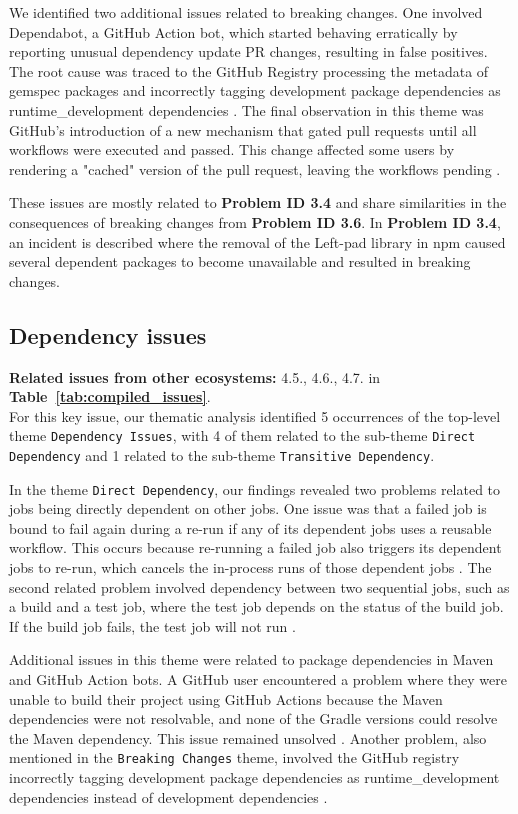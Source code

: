 \documentclass[conference]{IEEEtran}
\begin{document}
	We identified two additional issues related to breaking changes. One involved Dependabot, a GitHub Action bot, which started behaving erratically by reporting unusual dependency update PR changes, resulting in false positives. The root cause was traced to the GitHub Registry processing the metadata of gemspec packages and incorrectly tagging development package dependencies as runtime\_development dependencies \cite{nbibler2024}. The final observation in this theme was GitHub's introduction of a new mechanism that gated pull requests until all workflows were executed and passed. This change affected some users by rendering a "cached" version of the pull request, leaving the workflows pending \cite{tuves2024}.

	These issues are mostly related to \textbf{Problem ID 3.4} and share similarities in the consequences of breaking changes from \textbf{Problem ID 3.6}. In \textbf{Problem ID 3.4}, an incident is described where the removal of the Left-pad library in npm caused several dependent packages to become unavailable and resulted in breaking changes.
\subsection*{\textbf{Dependency issues}}
\textbf{Related issues from other ecosystems:} 4.5., 4.6., 4.7. in \textbf{Table~\ref{tab:compiled_issues}}.\\

	For this key issue, our thematic analysis identified 5 occurrences of the top-level theme \texttt{Dependency Issues}, with 4 of them related to the sub-theme \texttt{Direct Dependency} and 1 related to the sub-theme \texttt{Transitive Dependency}.

	In the theme \texttt{Direct Dependency}, our findings revealed two problems related to jobs being directly dependent on other jobs. One issue was that a failed job is bound to fail again during a re-run if any of its dependent jobs uses a reusable workflow. This occurs because re-running a failed job also triggers its dependent jobs to re-run, which cancels the in-process runs of those dependent jobs \cite{gvanrossum2024}. The second related problem involved dependency between two sequential jobs, such as a build and a test job, where the test job depends on the status of the build job. If the build job fails, the test job will not run \cite{hugomg2024}.

	Additional issues in this theme were related to package dependencies in Maven and GitHub Action bots. A GitHub user encountered a problem where they were unable to build their project using GitHub Actions because the Maven dependencies were not resolvable, and none of the Gradle versions could resolve the Maven dependency. This issue remained unsolved \cite{kxuenvoy2024}. Another problem, also mentioned in the \texttt{Breaking Changes} theme, involved the GitHub registry incorrectly tagging development package dependencies as runtime\_development dependencies instead of development dependencies \cite{nbibler2024}.
\end{document}
